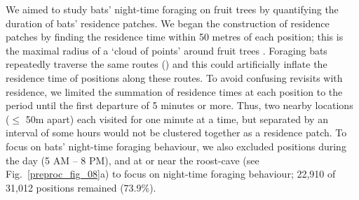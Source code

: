 We aimed to study bats' night-time foraging on fruit trees by quantifying the duration of bats' residence patches.
We began the construction of residence patches by finding the residence time within 50 metres of each position; this is the maximal radius of a `cloud of points' around fruit trees \citep{bracis2018}.
Foraging bats repeatedly traverse the same routes (\citealt{toledo2020, tsoar2011, lourie2021}) and this could artificially inflate the residence time of positions along these routes.
To avoid confusing revisits with residence, we limited the summation of residence times at each position to the period until the first departure of 5 minutes or more.
Thus, two nearby locations ($\leq$ 50m apart) each visited for one minute at a time, but separated by an interval of some hours would not be clustered together as a residence patch. 
To focus on bats' night-time foraging behaviour, we also excluded positions during the day (5 AM -- 8 PM), and at or near the roost-cave (see Fig.~\ref{preproc_fig_08}a) to focus on night-time foraging behaviour; 22,910 of 31,012 positions remained (73.9\%).

